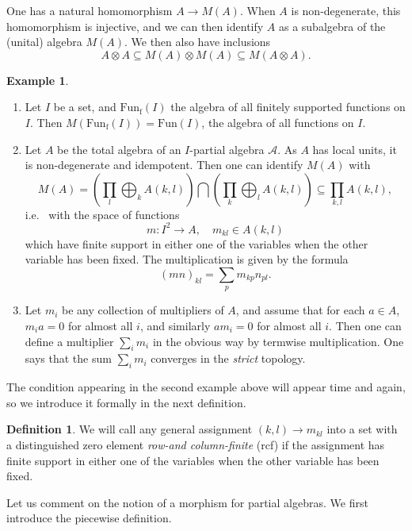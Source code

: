 \documentclass[10pt]{article}
\DeclareMathOperator{\fin}{\mathrm{f}}
\newcommand{\Fun}{\mathrm{Fun}}
\theoremstyle{definition}
\newtheorem{Def}[Theorem]{Definition}
\newtheorem{Exa}[Theorem]{Example}
\numberwithin{equation}{section}
\begin{document}
One has a natural homomorphism $A\rightarrow M(A)$. When $A$ is non-degenerate,  this homomorphism is injective, and we can then identify $A$ as a subalgebra of the (unital) algebra $M(A)$. We then also have inclusions \[A\otimes A\subseteq M(A)\otimes M(A)\subseteq M(A\otimes A).\]

\begin{Exa}\label{ExaMult} 
\begin{enumerate}
\item Let $I$ be a set, and $\Fun_{\fin}(I)$ the algebra of all finitely supported functions on $I$. Then $M(\Fun_{\fin}(I)) = \Fun(I)$, the algebra of all functions on $I$. 
\item Let $A$ be the total algebra of an $I$-partial algebra $\mathscr{A}$. As $A$ has local units, it is non-degenerate and idempotent. Then one can identify $M(A)$ with \[M(A) = \left(\prod_l \bigoplus_k A(k,l)\right) \bigcap \left(\prod_k\bigoplus_l A(k,l)\right) \subseteq \prod_{k,l} A(k,l),\] i.e.~ with the space of functions \[m:I^2\rightarrow A,\quad m_{kl}\in A(k,l)\] which have finite support in either one of the variables when the other variable has been fixed. The multiplication is given by the formula \[(mn)_{kl} = \sum_p m_{kp}n_{pl}.\]
\item Let $m_i$ be any collection of multipliers of $A$, and assume that for each $a\in A$, $m_ia =0$ for almost all $i$, and similarly $am_i=0$ for almost all $i$. Then one can define a multiplier $\sum_i m_i$ in the obvious way by termwise multiplication. One says that the sum $\sum_i m_i$ converges in the \emph{strict} topology. 
\end{enumerate}
\end{Exa}

The condition appearing in the second example above will appear time and again, so we introduce it formally in the next definition.

\begin{Def} We will call any general assignment $(k,l)\rightarrow m_{kl}$ into a set with a distinguished zero element \emph{row-and column-finite} (rcf) if the assignment has finite support in either one of the variables when the other variable has been fixed. 
\end{Def} 

Let us comment on the notion of a morphism for partial algebras. We first introduce the piecewise definition.
\end{document}
